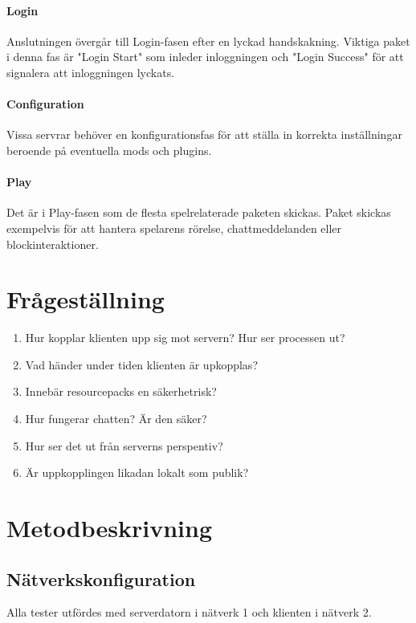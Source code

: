\documentclass[journal,comsoc]{IEEEtran}
\begin{document}
\paragraph{Login}
Anslutningen övergår till Login-fasen efter en lyckad handskakning. Viktiga paket i denna fas är "Login Start" som inleder inloggningen och "Login Success" för att signalera att inloggningen lyckats.

\paragraph{Configuration}
Vissa servrar behöver en konfigurationsfas för att ställa in korrekta inställningar beroende på eventuella mods och plugins.

\paragraph{Play}
Det är i Play-fasen som de flesta spelrelaterade paketen skickas. Paket skickas exempelvis för att hantera spelarens rörelse, chattmeddelanden eller blockinteraktioner.

\cite{wikivg:minecraftprotocol}

\section{Frågeställning}
\label{rq}
    \begin{enumerate}
      \item Hur kopplar klienten upp sig mot servern? Hur ser processen ut? \label{itm:rq1}
      \item Vad händer under tiden klienten är upkopplas? \label{itm:rq2}
      \item Innebär resourcepacks en säkerhetrisk? \label{itm:rq3}
      \item Hur fungerar chatten? Är den säker? \label{itm:rq4}
      \item Hur ser det ut från serverns perspentiv? \label{itm:rq5}
      \item Är uppkopplingen likadan lokalt som publik? \label{itm:rq6}
    \end{enumerate}
\section{Metodbeskrivning}
\subsection{Nätverkskonfiguration} 
Alla tester utfördes med serverdatorn i nätverk 1 och klienten i nätverk 2.
\end{document}
